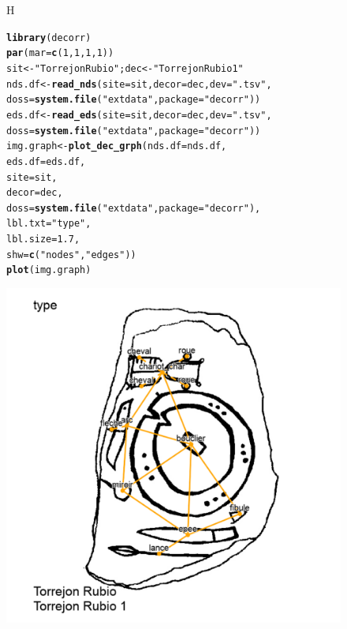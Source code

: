 \documentclass[article]{jss}\usepackage[]{graphicx}\usepackage[]{color}
\makeatletter
\def\maxwidth{ %
  \ifdim\Gin@nat@width>\linewidth
    \linewidth
  \else
    \Gin@nat@width
  \fi
}
\newcommand{\hlnum}[1]{\textcolor[rgb]{0.686,0.059,0.569}{#1}}%
\newcommand{\hlstr}[1]{\textcolor[rgb]{0.192,0.494,0.8}{#1}}%
\newcommand{\hlstd}[1]{\textcolor[rgb]{0.345,0.345,0.345}{#1}}%
\newcommand{\hlkwb}[1]{\textcolor[rgb]{0.69,0.353,0.396}{#1}}%
\newcommand{\hlkwc}[1]{\textcolor[rgb]{0.333,0.667,0.333}{#1}}%
\newcommand{\hlkwd}[1]{\textcolor[rgb]{0.737,0.353,0.396}{\textbf{#1}}}%
\newenvironment{kframe}{%
 \def\at@end@of@kframe{}%
 \ifinner\ifhmode%
  \def\at@end@of@kframe{\end{minipage}}%
  \begin{minipage}{\columnwidth}%
 \fi\fi%
 \def\FrameCommand##1{\hskip\@totalleftmargin \hskip-\fboxsep
 \colorbox{shadecolor}{##1}\hskip-\fboxsep
     \hskip-\linewidth \hskip-\@totalleftmargin \hskip\columnwidth}%
 \MakeFramed {\advance\hsize-\width
   \@totalleftmargin\z@ \linewidth\hsize
   \@setminipage}}%
 {\par\unskip\endMakeFramed%
 \at@end@of@kframe}
\newenvironment{knitrout}{}{} %
\makeatother
\begin{document}
\begin{figure}{H}
\centering
\begin{knitrout}
\color{fgcolor}\begin{kframe}
\begin{alltt}
\hlkwd{library}\hlstd{(decorr)}
\hlkwd{par}\hlstd{(}\hlkwc{mar}\hlstd{=}\hlkwd{c}\hlstd{(}\hlnum{1}\hlstd{,}\hlnum{1}\hlstd{,}\hlnum{1}\hlstd{,}\hlnum{1}\hlstd{) )}
\hlstd{sit} \hlkwb{<-} \hlstr{"Torrejon Rubio"} \hlstd{; dec} \hlkwb{<-} \hlstr{"Torrejon Rubio 1"}
\hlstd{nds.df} \hlkwb{<-} \hlkwd{read_nds}\hlstd{(}\hlkwc{site} \hlstd{= sit,} \hlkwc{decor} \hlstd{= dec,} \hlkwc{dev} \hlstd{=} \hlstr{".tsv"}\hlstd{,}
                   \hlkwc{doss} \hlstd{=} \hlkwd{system.file}\hlstd{(}\hlstr{"extdata"}\hlstd{,} \hlkwc{package} \hlstd{=} \hlstr{"decorr"}\hlstd{))}
\hlstd{eds.df} \hlkwb{<-} \hlkwd{read_eds}\hlstd{(}\hlkwc{site} \hlstd{= sit,} \hlkwc{decor} \hlstd{= dec,} \hlkwc{dev} \hlstd{=} \hlstr{".tsv"}\hlstd{,}
                   \hlkwc{doss} \hlstd{=} \hlkwd{system.file}\hlstd{(}\hlstr{"extdata"}\hlstd{,} \hlkwc{package} \hlstd{=} \hlstr{"decorr"}\hlstd{))}
\hlstd{img.graph} \hlkwb{<-} \hlkwd{plot_dec_grph}\hlstd{(}\hlkwc{nds.df} \hlstd{= nds.df,}
                           \hlkwc{eds.df} \hlstd{= eds.df,}
                           \hlkwc{site} \hlstd{= sit,}
                           \hlkwc{decor} \hlstd{= dec,}
                           \hlkwc{doss} \hlstd{=} \hlkwd{system.file}\hlstd{(}\hlstr{"extdata"}\hlstd{,} \hlkwc{package} \hlstd{=} \hlstr{"decorr"}\hlstd{),}
                           \hlkwc{lbl.txt} \hlstd{=} \hlstr{"type"}\hlstd{,}
                           \hlkwc{lbl.size}\hlstd{=}\hlnum{1.7}\hlstd{,}
                           \hlkwc{shw} \hlstd{=} \hlkwd{c}\hlstd{(}\hlstr{"nodes"}\hlstd{,}\hlstr{"edges"}\hlstd{))}
\hlkwd{plot}\hlstd{(img.graph)}
\end{alltt}
\end{kframe}
\includegraphics[width=\maxwidth]{figure/plotcm-1} 


\end{knitrout}
\end{figure}
\end{document}
